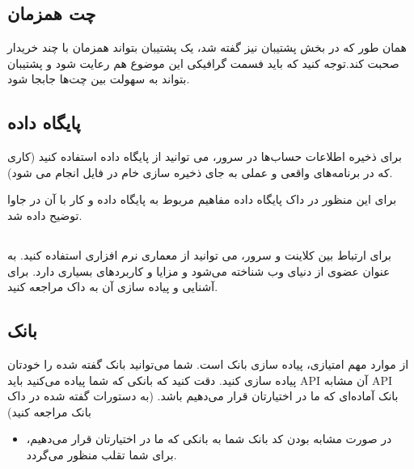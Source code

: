 \documentclass[]{article}
\begin{document}
\subsection*{{\titr چت همزمان}}

همان طور که در بخش پشتیبان نیز گفته شد،‌ یک پشتیبان بتواند همزمان با چند خریدار صحبت کند.توجه کنید که باید فسمت گرافیکی این موضوع هم رعایت شود و پشتیبان بتواند به سهولت بین چت‌ها جابجا شود.


\subsection*{{\titr پایگاه داده}}


برای ذخیره اطلاعات حساب‌ها در سرور، می توانید از پایگاه داده استفاده کنید (‌کاری که در برنامه‌های واقعی و عملی به جای ذخیره سازی خام در فایل انجام می شود).


برای این منظور در \textcolor{CustomColor}{داک پایگاه داده} مفاهیم مربوط به پایگاه داده و کار با آن در جاوا توضیح داده شد.



\subsection*{{}}

برای ارتباط بین کلاینت و سرور،‌ می توانید از معماری نرم افزاری  استفاده کنید.  به عنوان عضوی از دنیای وب شناخته می‌شود و مزایا و کاربردهای بسیاری دارد. برای آشنایی و پیاده سازی آن به داک  مراجعه کنید.




\subsection*{{\titr بانک}}

از موارد مهم امتیازی، پیاده سازی بانک است. شما می‌توانید بانک گفته شده را خودتان پیاده سازی کنید. دقت کنید که بانکی که شما پیاده می‌کنید باید API آن مشابه API بانک آماده‌ای که ما در اختیارتان قرار می‌دهیم باشد. (‌به دستورات گفته شده در
\textcolor{CustomColor}{داک بانک}
  مراجعه کنید)
 


\begin{itemize}[label = $\star$]
\item

در صورت مشابه بودن کد بانک شما به بانکی که ما در اختیارتان قرار می‌دهیم،‌ برای شما \textcolor{CustomColor}{تقلب} منظور می‌گردد.


\end{itemize}
\end{document}
